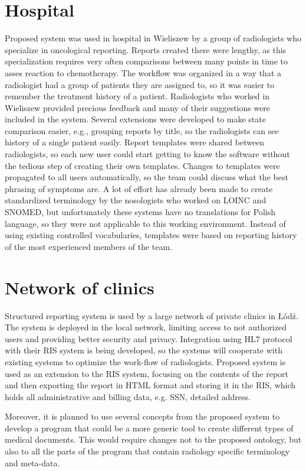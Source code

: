 \documentclass[12pt, twoside, openany]{report}
\theoremstyle{definition}
\begin{document}
\section{Hospital}
Proposed system was used in hospital in Wieliszew by a group of radiologists who specialize in oncological reporting. Reports created there were lengthy, as this specialization requires very often comparisons between many points in time to asses reaction to chemotherapy. The workflow was organized in a way that a radiologist had a group of patients they are assigned to, so it was easier to remember the treatment history of a patient. Radiologists who worked in Wieliszew provided precious feedback and many of their suggestions were included in the system. Several extensions were developed to make state comparison easier, e.g., grouping reports by title, so the radiologists can see history of a single patient easily. 
Report templates were shared between radiologists, so each new user could start getting to know the software without the tedious step of creating their own templates. Changes to templates were propagated to all users automatically, so the team could discuss what the best phrasing of symptoms are. A lot of effort has already been made to create standardized terminology by the nosologists who worked on LOINC and SNOMED, but unfortunately these systems have no translations for Polish language, so they were not applicable to this working environment. Instead of using existing controlled vocabularies, templates were based on reporting history of the most experienced members of the team.

\section{Network of clinics}
Structured reporting system is used by a large network of private clinics in Łódź. The system is deployed in the local network, limiting access to not authorized users and providing better security and privacy. Integration using HL7 protocol with their RIS system is being developed, so the systems will cooperate with existing systems to optimize the work-flow of radiologists. Proposed system is used as an extension to the RIS system, focusing on the contents of the report and then exporting the report in HTML format and storing it in the RIS, which holds all administrative and billing data, e.g. SSN, detailed address.

Moreover, it is planned to use several concepts from the proposed system to develop a program that could be a more generic tool to create different types of medical documents. This would require changes not to the proposed ontology, but also to all the parts of the program that contain radiology specific terminology and meta-data.
\end{document}
